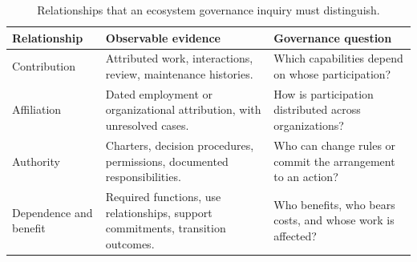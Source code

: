 \begin{table}[tbp]
\caption{Relationships that an ecosystem governance inquiry must distinguish.}
\label{tab:ch9-relations}
\centering\small\renewcommand{\arraystretch}{1.14}
\begin{tabularx}{\linewidth}{@{}>{\raggedright\arraybackslash}p{24mm}>{\raggedright\arraybackslash}X>{\raggedright\arraybackslash}X@{}}\toprule
Relationship & Observable evidence & Governance question \\\midrule
Contribution & Attributed work, interactions, review, maintenance histories. & Which capabilities depend on whose participation?\\
Affiliation & Dated employment or organizational attribution, with unresolved cases. & How is participation distributed across organizations?\\
Authority & Charters, decision procedures, permissions, documented responsibilities. & Who can change rules or commit the arrangement to an action?\\
Dependence and benefit & Required functions, use relationships, support commitments, transition outcomes. & Who benefits, who bears costs, and whose work is affected?\\\bottomrule
\end{tabularx}
\end{table}
